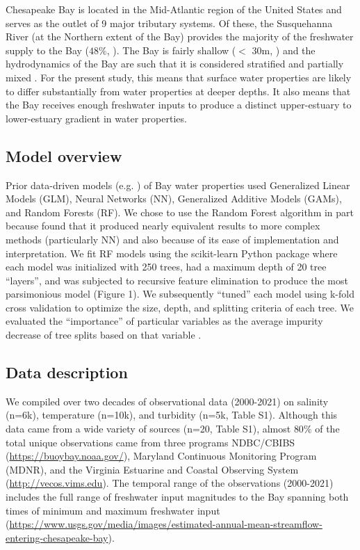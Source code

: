\documentclass{article}
\begin{document}
Chesapeake Bay is located in the Mid-Atlantic region of the United States and serves as the outlet of 9 major tributary systems. Of these, the Susquehanna River (at the Northern extent of the Bay) provides the majority of the freshwater supply to the Bay (\texttildelow$48\%$, \citet{xuClimateForcingSalinity2012}). The Bay is fairly shallow ($<$ 30m, \citet{murphyComparisonSpatialInterpolation2010}) and the hydrodynamics of the Bay are such that it is considered stratified and partially mixed \citep{xuClimateForcingSalinity2012}. For the present study, this means that surface water properties are likely to differ substantially from water properties at deeper depths. It also means that the Bay receives enough freshwater inputs to produce a distinct upper-estuary to lower-estuary gradient in water properties.

\subsection{Model overview}

Prior data-driven models (e.g. \citet{urquhartGeospatialInterpolationMODISderived2013, vogelAssessingSatelliteSea2016}) of Bay water properties used Generalized Linear Models (GLM), Neural Networks (NN), Generalized Additive Models (GAMs), and Random Forests (RF). We chose to use the Random Forest algorithm in part because \citet{urquhartGeospatialInterpolationMODISderived2013} found that it produced nearly equivalent results to more complex methods (particularly NN) and also because of its ease of implementation and interpretation. We fit RF models using the scikit-learn Python package \citep{pedregosaScikitlearnMachineLearning2011} where each model was initialized with 250 trees, had a maximum depth of 20 tree “layers”, and was subjected to recursive feature elimination to produce the most parsimonious model (Figure 1). We subsequently “tuned” each model using k-fold cross validation to optimize the size, depth, and splitting criteria of each tree. We evaluated the “importance” of particular variables as the average impurity decrease of tree splits based on that variable \citep{pedregosaScikitlearnMachineLearning2011}.

\subsection{Data description}

\begin{sloppypar}
We compiled over two decades of observational data (2000-2021) on salinity (n=6k), temperature (n=10k), and turbidity (n=5k, Table S1). Although this data came from a wide variety of sources (n=20, Table S1), almost $80\%$ of the total unique observations came from three programs NDBC/CBIBS (\url{https://buoybay.noaa.gov/}), Maryland Continuous Monitoring Program (MDNR), and the Virginia Estuarine and Coastal Observing System (\url{http://vecos.vims.edu}). The temporal range of the observations (2000-2021) includes the full range of freshwater input magnitudes to the Bay spanning both times of minimum and maximum freshwater input (\url{https://www.usgs.gov/media/images/estimated-annual-mean-streamflow-entering-chesapeake-bay}).
\end{sloppypar}
\end{document}
